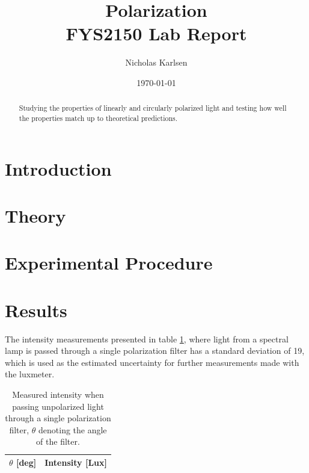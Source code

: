\documentclass[11pt,a4paper]{article}
\begin{document}
\title{Polarization\\
\normalsize{FYS2150 Lab Report}\\}

\author{Nicholas Karlsen}

\date{\today}%

\maketitle
\begin{abstract}
  Studying the properties of linearly and circularly polarized light and testing how well the properties match up to theoretical predictions.
\end{abstract}
\twocolumn


\section{\label{sect:intro}Introduction}
  

\section{\label{sect:theory}Theory}

\section{\label{section:experimental}Experimental Procedure} 

\section{\label{sect:results}Results}
  
  The intensity measurements presented in table \ref{tab:ana}, where light from a spectral lamp is passed through a single polarization filter has a standard deviation of 19, which is used as the estimated uncertainty for further measurements made with the luxmeter.


  \begin{table}[H]
      \center
      \caption{Measured intensity when passing unpolarized light through a single polarization filter, $\theta$ denoting the angle of the filter.}
       \begin{tabular}{r | l}
        $\theta$ [deg] & Intensity [Lux] \\ \hline
         
       \end{tabular}
       \label{tab:ana}
  \end{table}
\end{document}
